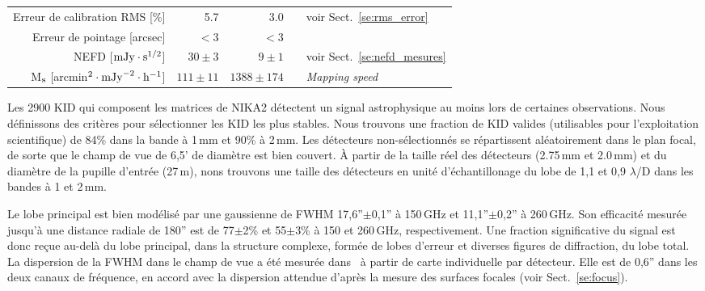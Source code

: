 \begin{table}[!thbp]
\begin{tabular}{rrrcl}
  Erreur de calibration RMS [\%]          &   5.7       &     3.0       & & \footnotesize{voir Sect.~\ref{se:rms_error}} \\
  Erreur de pointage    [arcsec]          & $<3$ &  $<3$  & & \footnotesize{\citet{Greve1996}} \\
  \hline
  \noalign{\smallskip}
  NEFD \hspace{3mm} [$\rm{mJy} \cdot \rm{s}^{1/2}$]  & $30 \pm 3$  & $9 \pm 1$ &  & \footnotesize{voir Sect.~\ref{se:nefd_mesures}}\\
  M$_{\rm{s}}$\hspace{3mm} [arcmin$^2 \cdot
    \rm{mJy}^{-2} \cdot \rm{h}^{-1}$] & $111 \pm 11$  &  $1388 \pm 174$ &  & \footnotesize{\emph{Mapping speed}}\\
  \hline
  \end{tabular}
\end{table}

Les 2900 KID qui composent les matrices de NIKA2 détectent un signal
astrophysique au moins lors de certaines observations. Nous
définissons des critères pour sélectionner les KID les plus
stables. Nous trouvons une fraction de KID valides (utilisables pour
l'exploitation scientifique) de 84\% dans la bande à 1\,mm et 90\% à
2\,mm. Les détecteurs non-sélectionnés se répartissent aléatoirement
dans le plan focal, de sorte que le champ de vue de 6,5' de diamètre
est bien couvert. \`A partir de la taille réel des détecteurs
(2.75\,mm et 2.0\,mm) et du diamètre de la pupille d'entrée (27\,m),
nons trouvons une taille des détecteurs en unité d'échantillonage du
lobe de 1,1 et 0,9 $\lambda$/D dans les bandes à 1 et 2\,mm.   

Le lobe principal est bien modélisé par une gaussienne de FWHM
17,6''$\pm$0,1'' à 150\,GHz et 11,1''$\pm$0,2'' à 260\,GHz. Son
efficacité mesurée jusqu'à une distance radiale de 180'' est de
77$\pm$2\% et 55$\pm$3\% à 150 et 260\,GHz, respectivement. Une
fraction significative du signal est donc reçue au-delà du lobe
principal, dans la structure complexe, formée de lobes d'erreur et
diverses figures de diffraction, du lobe total. La dispersion de la
FWHM dans le champ de vue a été mesurée dans~\citet{Adam2018} à partir
de carte individuelle par détecteur. Elle est de 0,6'' dans les deux
canaux de fréquence, en accord avec la dispersion attendue d'après la
mesure des surfaces focales (voir Sect.~\ref{se:focus}).   


